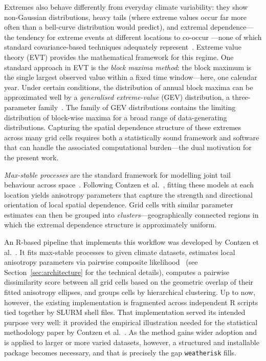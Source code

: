 \documentclass[preprint,12pt,a4paper]{elsarticle}
\begin{document}
Extremes also behave differently from everyday climate
variability: they show non-Gaussian distributions, heavy
tails (where extreme values occur far more often than a bell-curve
distribution would predict), and extremal dependence---the
tendency for extreme events at different locations to co-occur%
---none of which standard
covariance-based techniques adequately represent~\cite{dehaan2006}. Extreme
value theory (EVT) provides the mathematical framework
for this regime. One standard approach in EVT is the
\emph{block maxima method}: the block maximum is the single largest
observed value within a fixed time window---here, one calendar year.
Under certain conditions, the distribution
of annual block maxima can be approximated well by a
\emph{generalised extreme-value} (GEV) distribution, a
three-parameter family~\cite{dehaan2006,padoan2010}. The family of GEV distributions contains the limiting
distribution of block-wise maxima for a broad range of data-generating
distributions. Capturing the
spatial dependence structure of these extremes across many grid
cells requires both a statistically sound framework and software
that can handle the associated computational burden---the dual
motivation for the present work.

\emph{Max-stable processes} are the standard framework for
modelling joint tail behaviour across space~\cite{dehaan2006,padoan2010}.
Following Contzen et al.~\cite{contzen2025}, fitting these models at each location
yields anisotropy parameters that capture the strength and
directional orientation of local spatial dependence.
Grid cells with similar parameter estimates can then be grouped
into \emph{clusters}---geographically connected regions in which
the extremal dependence structure is approximately uniform.

An R-based pipeline that implements this workflow was developed
by Contzen et al.~\cite{contzen2025}. It fits max-stable processes to given
climate datasets,
estimates local anisotropy parameters via pairwise composite
likelihood~\cite{padoan2010} (see Section~\ref{sec:architecture} for the
technical details), computes a pairwise dissimilarity score between
all grid cells based on the geometric overlap of their fitted
anisotropy ellipses, and groups cells by hierarchical clustering. Up
to now, however, the existing implementation is fragmented across independent
R scripts tied together by SLURM shell files. That implementation
served its intended purpose very well: it provided the empirical
illustration needed for the statistical methodology paper by Contzen
et al.~\cite{contzen2025}. As the method gains wider adoption and is applied to
larger or more varied datasets, however, a structured and installable
package becomes necessary, and that is precisely the gap
\texttt{weatherisk} fills.
\end{document}
